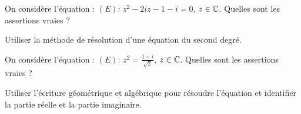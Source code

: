 \begin{question} 
On considère l'équation : $(E) : \, z^2-2iz-1-i=0$, $z\in \mathbb{C}$.   Quelles sont les assertions vraies ?
\begin{answers}
    

    
\end{answers}
\begin{explanations}
Utiliser la méthode de résolution d'une équation du second degré.
\end{explanations}

\end{question}



\begin{question} 
On considère l'équation : $(E) : \, z^2 = \frac{1+i}{\sqrt 2}$, $z\in \mathbb{C}$.   Quelles sont les assertions vraies ?
\begin{answers}
      
    

    
    
\end{answers}
\begin{explanations}
Utiliser l'écriture géométrique et algébrique pour résoudre l'équation et identifier la partie réelle et la partie imaginaire.
\end{explanations}

\end{question}


